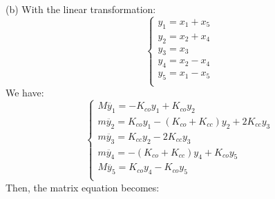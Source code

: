 \documentclass[11pt,letterpaper]{article}
\begin{document}
\newpage
\newpage
(b)
With the linear transformation:
$$
  \begin{cases}
   y_1=x_1+x_5\\
   y_2=x_2+x_4\\
   y_3=x_3\\
   y_4=x_2-x_4\\
   y_5=x_1-x_5\\
     \end{cases}
$$
We have:
\[
  \begin{cases}
	M\ddot{y_1}=-K_{co}y_1+K_{co}y_2\\
	m\ddot{y_2}=K_{co}y_1-(K_{co}+K_{cc})y_2+2K_{cc}y_3\\
	m\ddot{y_3}=K_{cc}y_2-2K_{cc}y_3\\
	m\ddot{y_4}=-(K_{co}+K_{cc})y_4+K_{co}y_5\\
	M\ddot{y_5}=K_{co}y_4-K_{co}y_5\\
  \end{cases}
\]
Then, the matrix equation becomes:
\end{document}
